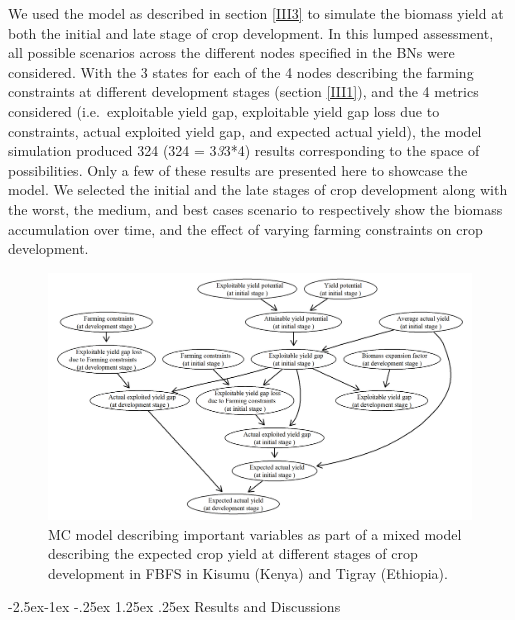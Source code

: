 \documentclass[12pt,oneside]{article}
\makeatletter
\renewcommand\paragraph{\@startsection{paragraph}{4}{\z@}%
            {-2.5ex\@plus -1ex \@minus -.25ex}%
            {1.25ex \@plus .25ex}%
            {\normalfont\normalsize\bfseries}}
\makeatother
\begin{document}
We used the model as described in section \ref{III3} to simulate the biomass yield at both the initial and late stage of crop development. In this lumped assessment, all possible scenarios across the different nodes specified in the BNs were considered. With the 3 states for each of the 4 nodes describing the farming constraints at different development stages (section \ref{III1}), and the 4 metrics considered (i.e.~exploitable yield gap, exploitable yield gap loss due to constraints, actual exploited yield gap, and expected actual yield), the model simulation produced 324 (324 = 3\emph{3}3*4) results corresponding to the space of possibilities. Only a few of these results are presented here to showcase the model. We selected the initial and the late stages of crop development along with the worst, the medium, and best cases scenario to respectively show the biomass accumulation over time, and the effect of varying farming constraints on crop development.

\begin{figure}[!htbp]

{\centering \includegraphics[width=1\linewidth,]{figures/Modelling_FBFS_Monte_carlo_model} 

}

\caption{MC model describing important variables as part of a mixed model describing the expected crop yield at different stages of crop development in FBFS in Kisumu (Kenya) and Tigray (Ethiopia).}\label{fig:fig7}
\end{figure}

\hypertarget{IV223}{%
\paragraph{Results and Discussions}\label{IV223}}
\end{document}
